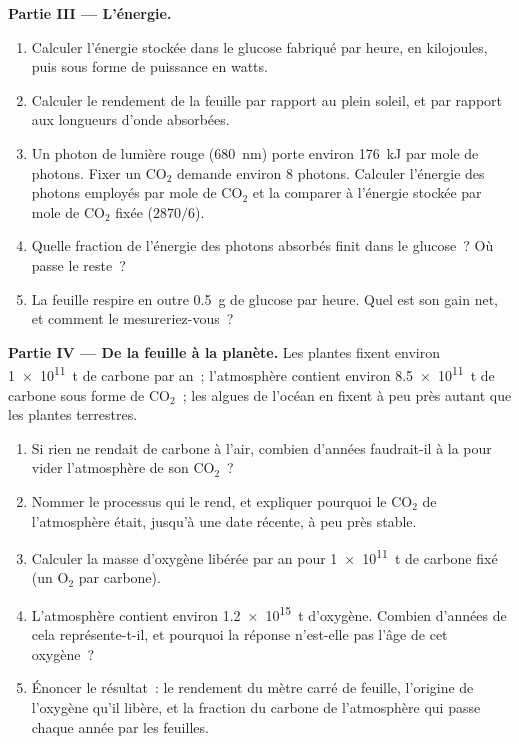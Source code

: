 \begin{problem}
\medskip
\noindent\textbf{Partie III --- L'énergie.}
\begin{enumerate}[resume]
  \item Calculer l'énergie stockée dans le glucose fabriqué par heure,
        en kilojoules, puis sous forme de puissance en watts.
  \item Calculer le rendement de la feuille par rapport au plein
        soleil, et par rapport aux longueurs d'onde absorbées.
  \item Un photon de lumière rouge (\qty{680}{nm}) porte environ
        \qty{176}{kJ} par mole de photons. Fixer un $\mathrm{CO_2}$
        demande environ 8 photons. Calculer l'énergie des photons
        employés par mole de $\mathrm{CO_2}$ et la comparer à
        l'énergie stockée par mole de $\mathrm{CO_2}$ fixée
        ($2870/6$).
  \item Quelle fraction de l'énergie des photons absorbés finit dans
        le glucose~? Où passe le reste~?
  \item La feuille respire en outre \qty{0.5}{g} de glucose par heure.
        Quel est son gain net, et comment le mesureriez-vous~?
\end{enumerate}

\medskip
\noindent\textbf{Partie IV --- De la feuille à la planète.}
Les plantes fixent environ \qty{1e11}{t} de carbone par an~;
l'atmosphère contient environ \qty{8.5e11}{t} de carbone sous forme de
$\mathrm{CO_2}$~; les algues de l'océan en fixent à peu près autant
que les plantes terrestres.
\begin{enumerate}[resume]
  \item Si rien ne rendait de carbone à l'air, combien d'années
        faudrait-il à la  pour vider l'atmosphère de son
        $\mathrm{CO_2}$~?
  \item Nommer le processus qui le rend, et expliquer pourquoi le
        $\mathrm{CO_2}$ de l'atmosphère était, jusqu'à une date
        récente, à peu près stable.
  \item Calculer la masse d'oxygène libérée par an pour \qty{1e11}{t}
        de carbone fixé (un $\mathrm{O_2}$ par carbone).
  \item L'atmosphère contient environ \qty{1.2e15}{t} d'oxygène.
        Combien d'années de  cela représente-t-il, et
        pourquoi la réponse n'est-elle pas l'âge de cet oxygène~?
  \item Énoncer le résultat~: le rendement du mètre carré de feuille,
        l'origine de l'oxygène qu'il libère, et la fraction du carbone
        de l'atmosphère qui passe chaque année par les feuilles.
\end{enumerate}
\end{problem}
